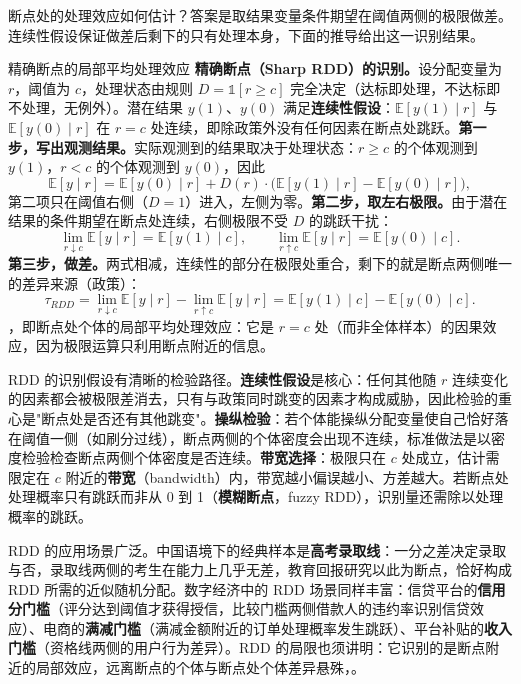 断点处的处理效应如何估计？答案是取结果变量条件期望在阈值两侧的极限做差。连续性假设保证做差后剩下的只有处理本身，下面的推导给出这一识别结果。

\begin{derivation}{精确断点的局部平均处理效应}{}
\textbf{精确断点（Sharp RDD）的识别。}设分配变量为 $r$，阈值为 $c$，处理状态由规则 $D = \mathbb{1}[r \geq c]$ 完全决定（达标即处理，不达标即不处理，无例外）。潜在结果 $y(1)$、$y(0)$ 满足\textbf{连续性假设}：$\mathbb{E}[y(1) \mid r]$ 与 $\mathbb{E}[y(0) \mid r]$ 在 $r = c$ 处连续，即除政策外没有任何因素在断点处跳跃。\textbf{第一步，写出观测结果。}实际观测到的结果取决于处理状态：$r \geq c$ 的个体观测到 $y(1)$，$r < c$ 的个体观测到 $y(0)$，因此
\[
\mathbb{E}[y \mid r] = \mathbb{E}[y(0) \mid r] + D(r)\cdot\bigl(\mathbb{E}[y(1) \mid r] - \mathbb{E}[y(0) \mid r]\bigr),
\]
第二项只在阈值右侧（$D = 1$）进入，左侧为零。\textbf{第二步，取左右极限。}由于潜在结果的条件期望在断点处连续，右侧极限不受 $D$ 的跳跃干扰：
\[
\lim_{r \downarrow c} \mathbb{E}[y \mid r] = \mathbb{E}[y(1) \mid c],
\qquad
\lim_{r \uparrow c} \mathbb{E}[y \mid r] = \mathbb{E}[y(0) \mid c].
\]
\textbf{第三步，做差。}两式相减，连续性的部分在极限处重合，剩下的就是断点两侧唯一的差异来源（政策）：
\[
\tau_{RDD} = \lim_{r \downarrow c} \mathbb{E}[y \mid r] - \lim_{r \uparrow c} \mathbb{E}[y \mid r] = \mathbb{E}[y(1) \mid c] - \mathbb{E}[y(0) \mid c].
\]
，即断点处个体的局部平均处理效应：它是 $r = c$ 处（而非全体样本）的因果效应，因为极限运算只利用断点附近的信息。
\end{derivation}

RDD 的识别假设有清晰的检验路径。\textbf{连续性假设}是核心：任何其他随 $r$ 连续变化的因素都会被极限差消去，只有与政策同时跳变的因素才构成威胁，因此检验的重心是"断点处是否还有其他跳变"。\textbf{操纵检验}：若个体能操纵分配变量使自己恰好落在阈值一侧（如刷分过线），断点两侧的个体密度会出现不连续，标准做法是以密度检验检查断点两侧个体密度是否连续。\textbf{带宽选择}：极限只在 $c$ 处成立，估计需限定在 $c$ 附近的\textbf{带宽}（bandwidth）内，带宽越小偏误越小、方差越大。若断点处处理概率只有跳跃而非从 0 到 1（\textbf{模糊断点}，fuzzy RDD），识别量还需除以处理概率的跳跃。

RDD 的应用场景广泛。中国语境下的经典样本是\textbf{高考录取线}：一分之差决定录取与否，录取线两侧的考生在能力上几乎无差，教育回报研究以此为断点，恰好构成 RDD 所需的近似随机分配。数字经济中的 RDD 场景同样丰富：信贷平台的\textbf{信用分门槛}（评分达到阈值才获得授信，比较门槛两侧借款人的违约率识别信贷效应）、电商的\textbf{满减门槛}（满减金额附近的订单处理概率发生跳跃）、平台补贴的\textbf{收入门槛}（资格线两侧的用户行为差异）。RDD 的局限也须讲明：它识别的是断点附近的局部效应，远离断点的个体与断点处个体差异悬殊，。

